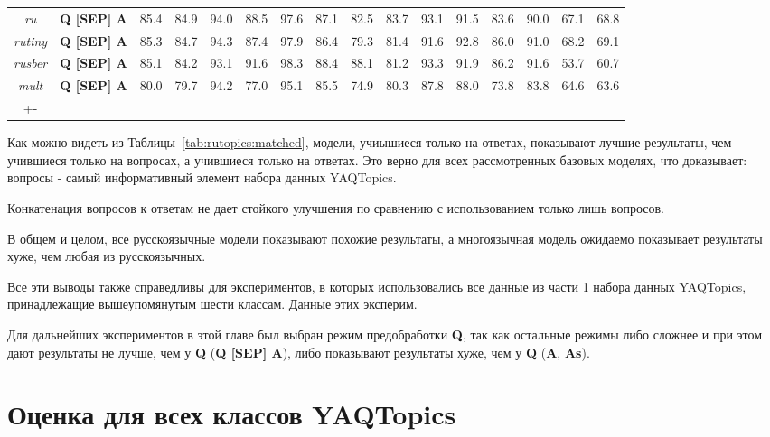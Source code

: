 \begin{table*}
{\begin{tabular}{|c|c||c|c|c|c|c|c|c|c|c|c|c|c|c|c|}
\textit{ru} &  \textbf{Q [SEP] A} & 85.4 & 84.9 & 94.0 & 88.5 & 97.6 & 87.1 & 82.5 & 83.7 & 93.1 & 91.5 & 83.6 & 90.0 & 67.1 & 68.8\\ %
\textit{rutiny} &  \textbf{Q [SEP] A} & 85.3 & 84.7 & 94.3 & 87.4 & 97.9 & 86.4 & 79.3 & 81.4 & 91.6 & 92.8 & 86.0 & 91.0 & 68.2 & 69.1\\ %
\textit{rusber} &  \textbf{Q [SEP] A} & 85.1 & 84.2 & 93.1 & 91.6 & 98.3 & 88.4 & 88.1 & 81.2 & 93.3 & 91.9 & 86.2 & 91.6 & 53.7 & 60.7\\ %
\textit{mult} &  \textbf{Q [SEP] A} & 80.0 & 79.7 & 94.2 & 77.0 & 95.1 & 85.5 & 74.9 & 80.3 & 87.8 & 88.0 & 73.8 & 83.8 & 64.6 & 63.6\\ \hline+-
\end{tabular}
}
\end{table*}

Как можно видеть из Таблицы~\ref{tab:rutopics:matched}, модели, учиышиеся только на ответах, показывают лучшие результаты, чем учившиеся только на вопросах, а учившиеся только на ответах. Это верно для всех рассмотренных базовых моделях, что доказывает: вопросы - самый информативный элемент набора данных {YAQTopics}. 

Конкатенация вопросов к ответам не дает стойкого улучшения по сравнению с использованием только лишь вопросов. 

В общем и целом, все русскоязычные модели показывают похожие результаты, а многоязычная модель ожидаемо показывает результаты хуже, чем любая из русскоязычных. 

Все эти выводы также справедливы для экспериментов, в которых использовались все данные из части 1 набора данных {YAQTopics}, принадлежащие вышеупомянутым шести классам. Данные этих эксперим.

Для дальнейших экспериментов в этой главе был выбран режим предобработки \textbf{Q}, так как остальные режимы либо сложнее и при этом дают результаты не лучше, чем у \textbf{Q} (\textbf{Q [SEP] A}), либо показывают результаты хуже, чем у \textbf{Q} (\textbf{A}, \textbf{As}).

\section{Оценка для всех классов {YAQTopics}}

